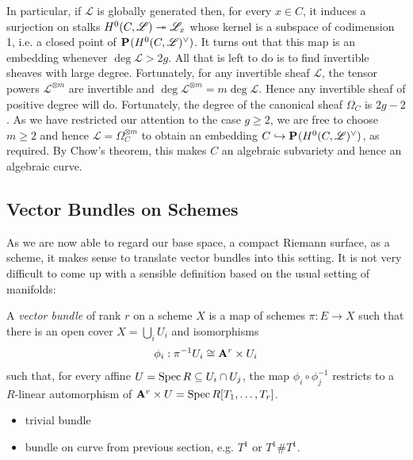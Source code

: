 \documentclass[12pt]{ociamthesis}  %
\begin{document}
In particular, if $\mathscr L$ is globally generated then,
for every $x\in C$, it induces a surjection on stalks
$H^0(C,\mathscr L) \twoheadrightarrow \mathscr L_x$ whose kernel is a
subspace of codimension 1, i.e. a closed point of
$\mathbf{P}^{}_{}(H^0(C,\mathscr L)^\vee)$. It turns out that this map is an embedding
whenever $\deg\mathscr L > 2g$. \cite[Proposition 2.14]{harris2011}
All that is left to do is to find invertible sheaves with large
degree. Fortunately, for any invertible sheaf $\mathscr L$,
the tensor powers $\mathscr L^{\otimes m}$ are invertible and
$\deg\mathscr L^{\otimes m} = m\deg\mathscr L$. Hence any invertible
sheaf of positive degree will do. Fortunately, the degree of
the canonical sheaf $\Omega_C$ is $2g-2$. As we have restricted
our attention to the case $g\geq 2$, we are free to choose
$m\geq 2$ and hence $\mathscr L = \Omega_C^{\otimes m}$ to obtain
an embedding $C\hookrightarrow\mathbf{P}^{}_{}(H^0(C,\mathscr L)^\vee)$, as
required.
By Chow's theorem, this makes $C$ an algebraic subvariety
and hence an algebraic curve.

\subsection{Vector Bundles on Schemes}

As we are now able to regard our base space, a compact Riemann
surface, as a scheme, it makes sense to translate vector bundles
into this setting. It is not very difficult to come up with a
sensible definition based on the usual setting of manifolds:

\begin{definition}
  \label{def:vector_bundle}
  A \emph{vector bundle} of rank $r$ on a scheme $X$ is
  a map of schemes $\pi : E \to X$ such that there is an open
  cover $X = \bigcup_i U_i$ and isomorphisms
  \begin{align}\label{eq:trivialisation}
    \phi_i : {\pi}^{-1}U_i \cong \mathbf{A}^{r}_{}\times U_i
  \end{align}
  such that, for every affine $U = \operatorname{Spec} R \subseteq U_i \cap U_j$,
  the map $\phi_i \circ \phi^{-1}_j$ restricts to a $R$-linear
  automorphism of $\mathbf{A}^{r}_{}\times U = \operatorname{Spec} R[T_1,\ldots,T_r]$.
\end{definition}

\begin{example}
  \begin{itemize}
    \item trivial bundle
    \item bundle on curve from previous section, e.g. $T^1$ or
          $T^1 \# T^1$.
  \end{itemize}
\end{example}
\end{document}
